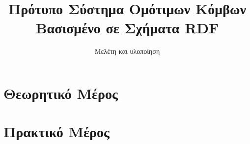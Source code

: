\documentclass[clearsans,hyperref,watermark,%
		histinit,noindex,newlogo,plain]{teipel-thesis-xelatex}
\title{Πρότυπο Σύστημα Ομότιμων Κόμβων \\Βασισμένο σε Σχήματα RDF}
\subtitle{Μελέτη και υλοποίηση}
\begin{document}
\maketitle

\beginfrontmatter
	
	
	
	\tableofcontents
	\listoffigures
	\listofillustrations
	\listoftables
	
	
\beginmainmatter

	
	\part{Θεωρητικό Μέρος}
		
		
	\part{Πρακτικό Μέρος} 
		
		
		
		
		
\end{document}
